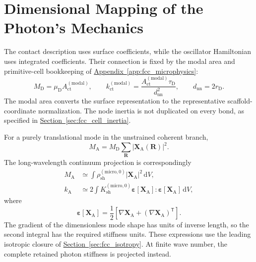 \section{Dimensional Mapping of the Photon's Mechanics}

The contact description uses surface coefficients, while the oscillator Hamiltonian uses integrated coefficients. Their connection is fixed by the modal area and primitive-cell bookkeeping of \hyperref[app:fcc_microphysics]{Appendix~\ref*{app:fcc_microphysics}}:
\begin{equation}
    M_{\mathrm D}
    =\mu_{\mathrm D}A_{\mathrm{ct}}^{(\mathrm{modal})},
    \qquad
    k_{\mathrm{ct}}^{(\mathrm{modal})}
    =\frac{A_{\mathrm{ct}}^{(\mathrm{modal})}\tau_{\mathrm D}}
    {d_{\mathrm{nn}}^{2}},
    \qquad
    d_{\mathrm{nn}}=2r_{\mathrm D}.
\end{equation}
The modal area converts the surface representation to the representative scaffold-coordinate normalization. The node inertia is not duplicated on every bond, as specified in \hyperref[sec:fcc_cell_inertia]{Section~\ref*{sec:fcc_cell_inertia}}.

For a purely translational mode in the unstrained coherent branch,
\begin{equation}
    M_{\mathrm A}
    =M_{\mathrm D}\sum_{\mathbf R}
    |\mathbf X_{\mathrm A}(\mathbf R)|^{2}.
\end{equation}
The long-wavelength continuum projection is correspondingly
\begin{align}
    M_{\mathrm A}
    &\simeq\int
    \rho_{\mathrm{sh}}^{(\mathrm{micro},0)}
    |\mathbf X_{\mathrm A}|^{2}\,\mathrm dV,
    \\
    k_{\mathrm A}
    &\simeq 2\int
    K_{\mathrm{sh}}^{(\mathrm{micro},0)}
    \boldsymbol\varepsilon[\mathbf X_{\mathrm A}]
    :\boldsymbol\varepsilon[\mathbf X_{\mathrm A}]\,\mathrm dV,
\end{align}
where
\begin{equation}
    \boldsymbol\varepsilon[\mathbf X_{\mathrm A}]
    =\frac12\left[
    \nabla\mathbf X_{\mathrm A}
    +(\nabla\mathbf X_{\mathrm A})^{\mathsf T}\right].
\end{equation}
The gradient of the dimensionless mode shape has units of inverse length, so the second integral has the required stiffness units. These expressions use the leading isotropic closure of \hyperref[sec:fcc_isotropy]{Section~\ref*{sec:fcc_isotropy}}. At finite wave number, the complete retained photon stiffness is projected instead.

